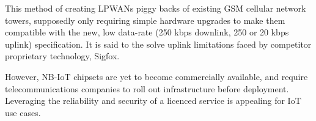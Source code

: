 This method of creating LPWANs piggy backs of existing GSM cellular network towers, supposedly only requiring simple hardware upgrades to make them compatible with the new, low data-rate (250 kbps downlink, 250 or 20 kbps uplink) specification. It is said to the solve uplink limitations faced by competitor proprietary technology, Sigfox.

However, NB-IoT chipsets are yet to become commercially available, and require telecommunications companies to roll out infrastructure before deployment. Leveraging the reliability and security of a licenced service is appealing for IoT use cases.
